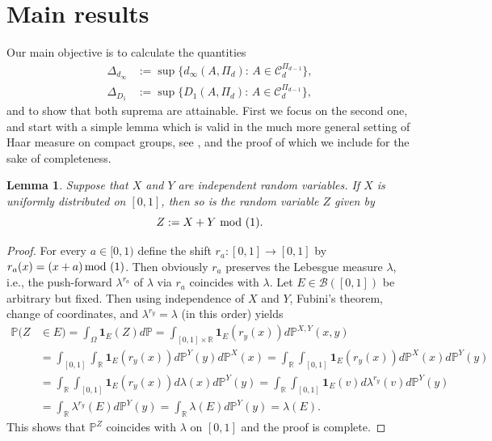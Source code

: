 \documentclass[12pt,a4paper]{amsart}
\newtheorem{lemma}[theorem]{Lemma}
\theoremstyle{definition}
\newcommand{\kc}{\mathcal{C}}
\begin{document}
\section{Main results}
Our main objective is to calculate the quantities
\begin{align}
\Delta_{d_\infty} &:= \sup\Big\{d_\infty(A,\Pi_d):\, A \in \kc_d^{\Pi_{d-1}}\Big\}, \\
\Delta_{D_1} &:= \sup\Big\{D_1(A,\Pi_d):\, A \in \kc_d^{\Pi_{d-1}}\Big\}, 
\end{align}
and to show that both suprema are attainable.
First we focus on the second one, and start with a simple lemma which is valid in the much 
more general setting of Haar measure on compact groups, see \cite{RuF}, and the proof of which 
we include for the sake of completeness. 
\begin{lemma}\label{lem:haar}
    Suppose that $X$ and $Y$ are independent random variables. 
    If $X$ is uniformly distributed on $[0,1]$,  
    then so is the random variable $Z$ given by 
    $$
    Z:= X +Y \,\, \textup{mod (1)}.
    $$
\end{lemma}
\begin{proof}
    For every $a \in [0,1)$ define the shift $r_a: [0,1] \rightarrow [0,1]$ by 
    $r_a(x)=(x+a) \, \textup{mod (1)}$. Then obviously $r_a$ preserves the Lebesgue 
    measure $\lambda$, i.e., 
    the push-forward $\lambda^{r_a}$ of $\lambda$ via $r_a$ coincides with $\lambda$.
    Let $E \in \mathcal{B}([0,1])$ be arbitrary but fixed. Then using independence of 
    $X$ and $Y$, Fubini's theorem, change of coordinates, and $\lambda^{r_y}=\lambda$ 
    (in this order) yields 
    \begin{align*}
    \mathbb{P}(Z &\in E) = \int_\Omega \mathbf{1}_E(Z) d\mathbb{P}  = 
                \int_{[0,1] \times \mathbb{R}} \mathbf{1}_{E}(r_y(x)) d \mathbb{P}^{X,Y}(x,y)\\
                &=\int_{[0,1]} \int_{\mathbb{R}} \mathbf{1}_{E}(r_y(x)) d \mathbb{P}^Y(y) 
                         d\mathbb{P}^X(x) = 
                  \int_{\mathbb{R}} \int_{[0,1]} \mathbf{1}_{E}(r_y(x)) d \mathbb{P}^X(x) 
                         d\mathbb{P}^Y(y) \\
                      &=  \int_{\mathbb{R}} \int_{[0,1]} \mathbf{1}_{E}(r_y(x)) 
                         d\lambda(x) d \mathbb{P}^Y(y)  = 
                         \int_{\mathbb{R}} \int_{[0,1]} \mathbf{1}_{E}(v) 
                         d\lambda^{r_y}(v) d \mathbb{P}^Y(y)\\ 
                      &= \int_{\mathbb{R}} \lambda^{r_y}(E)d\mathbb{P}^Y(y) 
                      = \int_{\mathbb{R}} \lambda(E)d\mathbb{P}^Y(y) = \lambda(E).    
    \end{align*}
   This shows that $\mathbb{P}^Z$ coincides with $\lambda$ on $[0,1]$ and the proof is complete. 
\end{proof}
\end{document}
